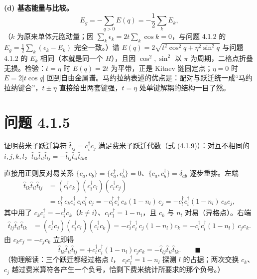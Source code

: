 \textbf{(d) 基态能量与比较。}
\begin{equation*}
E_g=-\sum_{q>0}E(q)=-\frac12\sum_kE_k,
\end{equation*}
（$k$ 为原来单体元胞动量；因 $\sum_k\epsilon_k=2t\sum_k\cos k=0$，与问题 4.1.2 的 $E_g=\frac12\sum_k(\epsilon_k-E_k)$ 完全一致。）谱 $E(q)=2\sqrt{t^2\cos^2q+\eta^2\sin^2q}$ 与问题 4.1.2 的 $E_k$ 相同（本就是同一个 $H$），且因 $\cos^2,\sin^2$ 以 $\pi$ 为周期，二格点折叠无损。检验：$t=\eta$ 时 $E(q)=2t$ 为平带，正是 Kitaev 链固定点；$\eta=0$ 时 $E=2|t\cos q|$ 回到自由金属谱。马约拉纳表述的优点是：配对与跃迁统一成“马约拉纳键合”，$t\pm\eta$ 直接给出两套键强，$t=\eta$ 处单键解耦的结构一目了然。

\section*{问题 4.1.5}
\begin{problem}
证明费米子跃迁算符 $\hat t_{ij}=c^\dagger_ic_j$ 满足费米子跃迁代数（式 (4.1.9)）：对互不相同的 $i,j,k,l$，$\hat t_{lk}\hat t_{il}\hat t_{lj}=-\hat t_{lj}\hat t_{il}\hat t_{lk}$。
\end{problem}
\solution
直接用正则反对易关系 $\{c_a,c_b\}=\{c^\dagger_a,c^\dagger_b\}=0$、$\{c_a,c^\dagger_b\}=\delta_{ab}$ 逐步重排。左端
\begin{align*}
\hat t_{lk}\hat t_{il}\hat t_{lj}
&=(c^\dagger_lc_k)(c^\dagger_ic_l)(c^\dagger_lc_j)\\
&=c^\dagger_l\,c_kc^\dagger_i\,c_lc^\dagger_l\,c_j
=-c^\dagger_lc^\dagger_i\,c_k(1-n_l)\,c_j
=-c^\dagger_lc^\dagger_i(1-n_l)\,c_kc_j ,
\end{align*}
其中用了 $c_kc^\dagger_i=-c^\dagger_ic_k$（$k\ne i$）、$c_lc^\dagger_l=1-n_l$，且 $c_k$ 与 $n_l$ 对易（异格点）。右端
\begin{align*}
\hat t_{lj}\hat t_{il}\hat t_{lk}
&=(c^\dagger_lc_j)(c^\dagger_ic_l)(c^\dagger_lc_k)
=-c^\dagger_lc^\dagger_i\,c_j(1-n_l)c_k
=-c^\dagger_lc^\dagger_i(1-n_l)\,c_jc_k .
\end{align*}
由 $c_kc_j=-c_jc_k$ 立即得
\begin{equation*}
\hat t_{lk}\hat t_{il}\hat t_{lj}
=+c^\dagger_lc^\dagger_i(1-n_l)c_jc_k
=-\hat t_{lj}\hat t_{il}\hat t_{lk}. \qquad\blacksquare
\end{equation*}
（物理解读：三个跃迁都经过格点 $l$， $c_lc^\dagger_l=1-n_l$ 探测 $l$ 的占据；两次交换 $c_k$、$c_j$ 越过费米算符各产生一个负号，恰剩下费米统计所要求的那个负号。）

